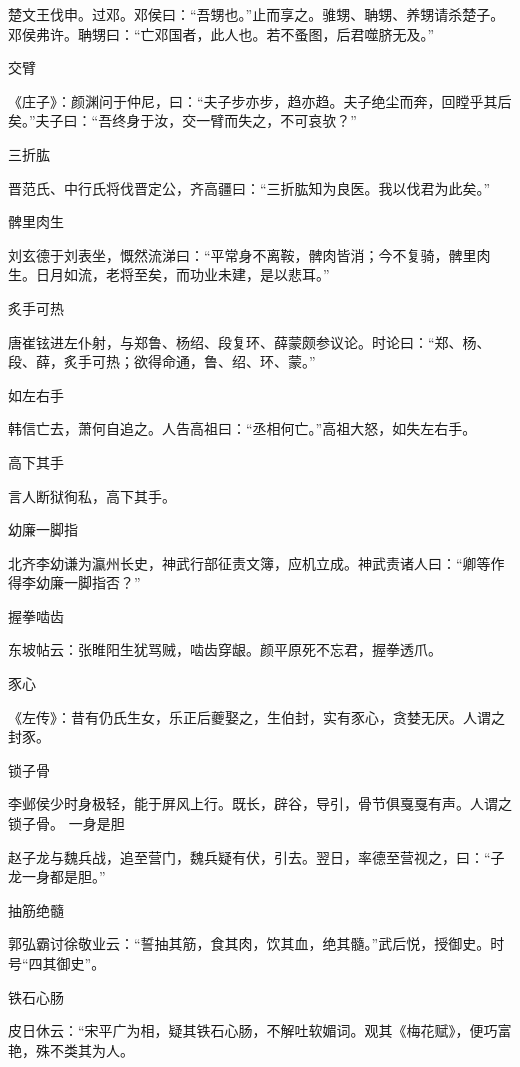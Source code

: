 \documentclass[a4paper,12pt,UTF8,twoside]{ctexbook}
\begin{document}
    楚文王伐申。过邓。邓侯曰：“吾甥也。”止而享之。骓甥、聃甥、养甥请杀楚子。邓侯弗许。聃甥曰：“亡邓国者，此人也。若不蚤图，后君噬脐无及。”
    
    交臂
    
    《庄子》：颜渊问于仲尼，曰：“夫子步亦步，趋亦趋。夫子绝尘而奔，回瞠乎其后矣。”夫子曰：“吾终身于汝，交一臂而失之，不可哀欤？”
    
    三折肱
    
    晋范氏、中行氏将伐晋定公，齐高疆曰：“三折肱知为良医。我以伐君为此矣。”
    
    髀里肉生
    
    刘玄德于刘表坐，慨然流涕曰：“平常身不离鞍，髀肉皆消；今不复骑，髀里肉生。日月如流，老将至矣，而功业未建，是以悲耳。”
    
    炙手可热
    
    唐崔铉进左仆射，与郑鲁、杨绍、段复环、薛蒙颇参议论。时论曰：“郑、杨、段、薛，炙手可热；欲得命通，鲁、绍、环、蒙。”
    
    如左右手
    
    韩信亡去，萧何自追之。人告高祖曰：“丞相何亡。”高祖大怒，如失左右手。
    
    高下其手
    
    言人断狱徇私，高下其手。
    
    幼廉一脚指
    
    北齐李幼谦为瀛州长史，神武行部征责文簿，应机立成。神武责诸人曰：“卿等作得李幼廉一脚指否？”
    
    握拳啮齿
    
    东坡帖云：张睢阳生犹骂贼，啮齿穿龈。颜平原死不忘君，握拳透爪。
    
    豕心
    
    《左传》：昔有仍氏生女，乐正后夔娶之，生伯封，实有豕心，贪婪无厌。人谓之封豕。
    
    锁子骨
    
    李邺侯少时身极轻，能于屏风上行。既长，辟谷，导引，骨节俱戛戛有声。人谓之锁子骨。
    一身是胆
    
    赵子龙与魏兵战，追至营门，魏兵疑有伏，引去。翌日，率德至营视之，曰：“子龙一身都是胆。”
    
    抽筋绝髓
    
    郭弘霸讨徐敬业云：“誓抽其筋，食其肉，饮其血，绝其髓。”武后悦，授御史。时号“四其御史”。
    
    铁石心肠
    
    皮日休云：“宋平广为相，疑其铁石心肠，不解吐软媚词。观其《梅花赋》，便巧富艳，殊不类其为人。
    
\end{document}
